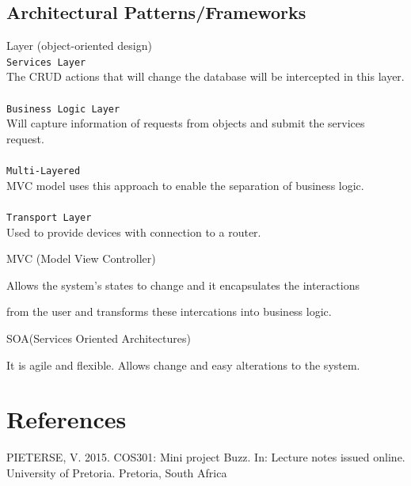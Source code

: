 \documentclass[a4paper,12pt]{report}
\begin{document}
\subsection{Architectural Patterns/Frameworks}
	\begin{description}
\item[$\bullet$] Layer (object-oriented design)\\
\texttt{Services Layer}\\
The CRUD actions that will change the database will be intercepted in this layer. \\ \\
\texttt{Business Logic Layer}\\
Will capture information of requests from objects and submit the services request.\\ \\
\texttt{Multi-Layered}\\
MVC model uses this approach to enable the separation of business logic.\\ \\
\texttt{Transport Layer}\\
Used to provide devices with connection to a router.
\item[$\bullet$] MVC (Model View Controller)
\item Allows the system's states to change and it encapsulates the interactions
\item from the user and transforms these intercations into business logic.
\item[$\bullet$] SOA(Services Oriented Architectures)
\item It is agile and flexible. Allows change and easy alterations to the system.
\end{description}
\section{References}
PIETERSE, V. 2015. COS301: Mini project Buzz. In: Lecture notes issued online. University of Pretoria. Pretoria, South Africa
\end{document}
